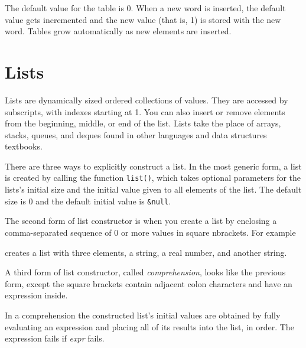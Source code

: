 
The default value for the table is 0. When a new word is inserted, the
default value gets incremented and the new value (that is, 1) is stored
with the new word. Tables grow automatically as new elements are
inserted.

\section{Lists}

Lists are dynamically sized ordered
collections of values. They are accessed by subscripts, with indexes
starting at 1. You can also insert or remove
elements from the beginning, middle, or end of the list. Lists take the
place of arrays, stacks, queues,
and deques found in other languages and data structures
textbooks.

There are three ways to explicitly construct a list.  In the most
generic form,
a list is created by calling the function \texttt{list()}, which
takes optional parameters for the lists's initial size and the initial value
given to all elements of the list.  The default size is 0 and the
default initial value is \texttt{\&null}.

The second form of list constructor is when you create a list by
enclosing a comma-separated sequence of 0 or more values in square
nbrackets. For example


\noindent creates a list with three elements, a string, a real number,
and another string.

A third form of list constructor, called {\em comprehension\/}, looks
like the previous form, except the square brackets contain adjacent colon
characters and have an expression inside.


In a comprehension the constructed list's initial values are obtained
by fully evaluating an expression and placing all of its results into the
list, in order. The expression fails if {\em expr\/} fails.

